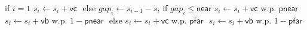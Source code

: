 if $i = 1$ 
	$s_i \gets s_i + \mathsf{vc}$ $\label{ln:lead_p}$
else 	
	$\mathit{gap}_i \gets s_{i-1} - s_i$
	if $\mathit{gap}_i \leq \mathsf{near}$
		$s_i \gets s_i + \mathsf{vc}$ w.p. $\mathsf{pnear}$ $\label{ln:other_p1}$ 
		$s_i \gets s_i + \mathsf{vb}$ w.p. $1 - \mathsf{pnear}$ $\label{ln:other_p2}$ 
	else
		$s_i \gets s_i + \mathsf{vc}$ w.p. $\mathsf{pfar}$ $\label{ln:other_p3}$
		$s_i \gets s_i + \mathsf{vb}$ w.p. $1- \mathsf{pfar}$ $\label{ln:other_p4}$ 
